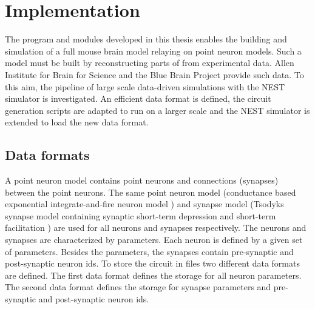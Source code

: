 %

\chapter{Implementation}

The program and modules developed in this thesis enables the building and simulation
of a full mouse brain model relaying on point neuron models. Such a model must be built by
reconstructing parts of from experimental data.
Allen Institute for Brain for Science and the Blue Brain Project provide such data.
To this aim, the pipeline of large scale data-driven simulations with the NEST simulator is investigated.
An efficient data format is defined, the circuit generation scripts are adapted to
run on a larger scale and the NEST simulator is extended to load the new data format.

\section{Data formats}
\label{sec:dataformats}
A point neuron model contains point neurons and connections (synapses) between the point neurons.
The same point neuron model (conductance based exponential integrate-and-fire neuron model \cite{brette2005adaptive}) and synapse model (Tsodyks synapse model containing synaptic short-term depression and short-term facilitation \cite{tsodyks1997neural, fuhrmann2002coding}) are used for all neurons and synapses respectively.
The neurons and synapses are characterized by parameters.
Each neuron is defined by a given set of parameters.
Besides the parameters, the synapses contain pre-synaptic and post-synaptic neuron ids.
To store the circuit in files two different data formats are defined.
The first data format defines the storage for all neuron parameters.
The second data format defines the storage for synapse parameters and pre-synaptic and post-synaptic neuron ids.

